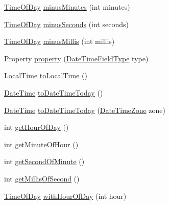 \begin{DoxyCompactItemize}
\item 
\hyperlink{classorg_1_1joda_1_1time_1_1_time_of_day}{Time\-Of\-Day} \hyperlink{classorg_1_1joda_1_1time_1_1_time_of_day_a2b58339b8c647253236a90703fe08137}{minus\-Minutes} (int minutes)
\item 
\hyperlink{classorg_1_1joda_1_1time_1_1_time_of_day}{Time\-Of\-Day} \hyperlink{classorg_1_1joda_1_1time_1_1_time_of_day_a7f6278e287a3b83c1155cfcb44e99563}{minus\-Seconds} (int seconds)
\item 
\hyperlink{classorg_1_1joda_1_1time_1_1_time_of_day}{Time\-Of\-Day} \hyperlink{classorg_1_1joda_1_1time_1_1_time_of_day_a64b16ca0400e92099a149e30b0bc96d0}{minus\-Millis} (int millis)
\item 
Property \hyperlink{classorg_1_1joda_1_1time_1_1_time_of_day_ad1a22987cc27751fd5a703d0612fdf01}{property} (\hyperlink{classorg_1_1joda_1_1time_1_1_date_time_field_type}{Date\-Time\-Field\-Type} type)
\item 
\hyperlink{classorg_1_1joda_1_1time_1_1_local_time}{Local\-Time} \hyperlink{classorg_1_1joda_1_1time_1_1_time_of_day_acddb122e7b39c112d83663d2fe66e0a8}{to\-Local\-Time} ()
\item 
\hyperlink{classorg_1_1joda_1_1time_1_1_date_time}{Date\-Time} \hyperlink{classorg_1_1joda_1_1time_1_1_time_of_day_a552147ccb05b42c3603aaac2c149f7f7}{to\-Date\-Time\-Today} ()
\item 
\hyperlink{classorg_1_1joda_1_1time_1_1_date_time}{Date\-Time} \hyperlink{classorg_1_1joda_1_1time_1_1_time_of_day_acb938b7ef5b93deb15f7af33bbe9705c}{to\-Date\-Time\-Today} (\hyperlink{classorg_1_1joda_1_1time_1_1_date_time_zone}{Date\-Time\-Zone} zone)
\item 
int \hyperlink{classorg_1_1joda_1_1time_1_1_time_of_day_aabdbae467ace0ffc9df089179eef9cda}{get\-Hour\-Of\-Day} ()
\item 
int \hyperlink{classorg_1_1joda_1_1time_1_1_time_of_day_ad464c97b500fa3a5420df06a0b5f0ce2}{get\-Minute\-Of\-Hour} ()
\item 
int \hyperlink{classorg_1_1joda_1_1time_1_1_time_of_day_a8db25ccd24412566625c24dff6bcea04}{get\-Second\-Of\-Minute} ()
\item 
int \hyperlink{classorg_1_1joda_1_1time_1_1_time_of_day_a195d349de347204740761b276c163f8b}{get\-Millis\-Of\-Second} ()
\item 
\hyperlink{classorg_1_1joda_1_1time_1_1_time_of_day}{Time\-Of\-Day} \hyperlink{classorg_1_1joda_1_1time_1_1_time_of_day_a6a0a6a7742e890b679769bd0aa8ff142}{with\-Hour\-Of\-Day} (int hour)
\item 

\end{DoxyCompactItemize}
